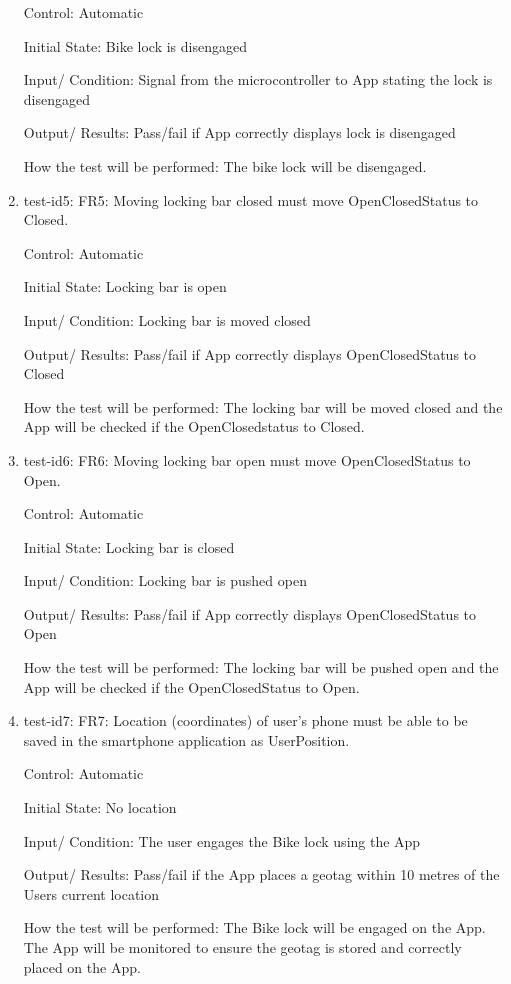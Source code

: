 \documentclass[12pt, titlepage]{article}
\begin{document}
\begin{enumerate}
Control: Automatic 

Initial State: Bike lock is disengaged 

Input/ Condition: Signal from the microcontroller to App stating the lock is disengaged 

Output/ Results: Pass/fail if App correctly displays lock is disengaged 

How the test will be performed: The bike lock will be disengaged. 

\item{test-id5: FR5: Moving locking bar closed must move OpenClosedStatus to Closed. \\} 

Control: Automatic 

Initial State: Locking bar is open 

Input/ Condition: Locking bar is moved closed 

Output/ Results: Pass/fail if App correctly displays OpenClosedStatus to Closed 

How the test will be performed: The locking bar will be moved closed and the App will be checked if the OpenClosedstatus to Closed. 

\item{test-id6: FR6: Moving locking bar open must move OpenClosedStatus to Open. \\} 

Control: Automatic 

Initial State: Locking bar is closed 

Input/ Condition: Locking bar is pushed open 

Output/ Results: Pass/fail if App correctly displays OpenClosedStatus to Open 

How the test will be performed: The locking bar will be pushed open and the App will be checked if the OpenClosedStatus to Open. 
 
\item{test-id7: FR7: Location (coordinates) of user’s phone must be able to be saved in the smartphone application as UserPosition. \\} 

Control: Automatic 

Initial State: No location  

Input/ Condition: The user engages the Bike lock using the App 

Output/ Results: Pass/fail if the App places a geotag within 10 metres of the Users current location 

How the test will be performed: The Bike lock will be engaged on the App. The App will be monitored to ensure the geotag is stored and correctly placed on the App.  


\end{enumerate}
\end{document}
